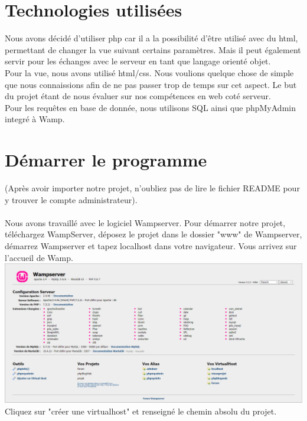 \documentclass{article}
\begin{document}
    \section{Technologies utilisées}
    Nous avons décidé d'utiliser php car il a la possibilité d'être utilisé avec du html, permettant de changer la vue suivant certains
    paramètres. Mais il peut également servir pour les échanges avec le serveur en tant que langage orienté objet.\\
    Pour la vue, nous avons utilisé html/css. Nous voulions quelque chose de simple que nous connaissions afin de ne pas passer trop de temps
    sur cet aspect. Le but du projet étant de nous évaluer sur nos compétences en web coté serveur.\\
    Pour les requêtes en base de donnée, nous utilisons SQL ainsi que phpMyAdmin integré à Wamp.


    \section{Démarrer le programme}
    (Après avoir importer notre projet, n'oubliez pas de lire le fichier README pour y trouver le compte administrateur).\\\\

    Nous avons travaillé avec le logiciel Wampserver. Pour démarrer notre projet, téléchargez WampServer, déposez le projet
    dans le dossier "www" de Wampserver, démarrez Wampserver et tapez localhost dans votre navigateur. Vous arrivez sur l'accueil
    de Wamp.\\
    
    \includegraphics[width=\textwidth]{images/wamp.PNG}\\
    
    Cliquez sur "créer une virtualhost" et renseigné le chemin absolu du projet.\\
    
\end{document}
